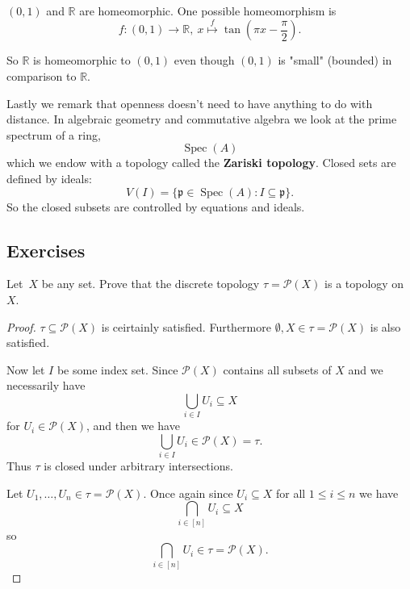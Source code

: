 \documentclass[11pt]{article}
\begin{document}
\begin{ex}
    $(0,1)$ and $\mathbb R$ are homeomorphic. 
    One possible homeomorphism is 
    \[
        f : (0,1) \to \mathbb R, \ 
        x \overset{f}{\mapsto} \tan\left(\pi x - \frac{\pi}{2}\right).
    \]
\end{ex}
So $\mathbb R$ is homeomorphic to $(0,1)$ even though $(0,1)$ is 
"small" (bounded) in comparison to $\mathbb R$.

Lastly we remark that openness doesn't need to have 
anything to do with distance. 
In algebraic geometry and commutative algebra we look at 
the prime spectrum of a ring, 
\[
    \operatorname{Spec}(A)
\]
which we endow with a topology called the \textbf{Zariski topology}. 
Closed sets are defined by ideals: 
\[
    V(I) = \{\mathfrak p \in \operatorname{Spec}(A) : 
    I \subseteq \mathfrak p\}. 
\]
So the closed subsets are controlled by equations and ideals. 

\subsection*{Exercises}

\begin{prob}
    Let $X$ be any set. Prove that 
    the discrete topology $\tau = \mathcal P(X)$ is 
    a topology on $X$. 
\end{prob}
\begin{proof}
    $\tau \subseteq \mathcal P(X)$ is ceirtainly satisfied. 
    Furthermore $\emptyset, X \in \tau = \mathcal P(X)$ is 
    also satisfied. 

    Now let $I$ be some index set. Since 
    $\mathcal P(X)$ contains all subsets of $X$ and we 
    necessarily have 
    \[
        \bigcup_{i \in I} U_i \subseteq X
    \]
    for $U_i \in \mathcal P(X)$, and then 
    we have 
    \[
        \bigcup_{i\in I} U_i \in \mathcal P(X) = \tau. 
    \]
    Thus $\tau$ is closed under arbitrary intersections. 

    Let $U_1,\ldots,U_n \in \tau = \mathcal P(X)$. 
    Once again since $U_i \subseteq X$ for all $1 \leq i \leq n$ we 
    have 
    \[
        \bigcap_{i\in[n]} U_i \subseteq X
    \]
    so 
    \[
        \bigcap_{i\in[n]} U_i \in \tau = \mathcal P(X).
    \]
\end{proof}
\end{document}
